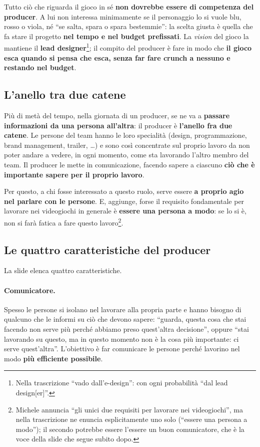 Tutto ciò che riguarda il gioco in sé \textbf{non dovrebbe essere di
competenza del producer}. A lui non interessa minimamente se il personaggio
lo si vuole blu, rosso o viola, né ``se salta, spara o spara bestemmie'': la
scelta giusta è quella che fa stare il progetto \textbf{nel tempo e nel budget
prefissati}. La \emph{vision} del gioco la mantiene il \textbf{lead
designer}\footnote{Nella trascrizione ``vado dall'e-design'': con ogni
probabilità ``dal lead design[er]''.}; il compito del producer è fare in modo
che \textbf{il gioco esca quando si pensa che esca, senza far fare crunch a
nessuno e restando nel budget}.

\subsection{L'anello tra due catene}

Più di metà del tempo, nella giornata di un producer, se ne va a
\textbf{passare informazioni da una persona all'altra}: il producer è
\textbf{l'anello fra due catene}. Le persone del team hanno le loro
specialità (design, programmazione, brand management, trailer, \dots) e sono
così concentrate sul proprio lavoro da non poter andare a vedere, in ogni
momento, come sta lavorando l'altro membro del team. Il producer le mette in
comunicazione, facendo sapere a ciascuno \textbf{ciò che è importante sapere
per il proprio lavoro}.

Per questo, a chi fosse interessato a questo ruolo, serve essere \textbf{a
proprio agio nel parlare con le persone}. E, aggiunge, forse il requisito
fondamentale per lavorare nei videogiochi in generale è \textbf{essere una
persona a modo}: se lo si è, non si farà fatica a fare questo
lavoro\footnote{Michele annuncia ``gli unici due requisiti per lavorare nei
videogiochi'', ma nella trascrizione ne enuncia esplicitamente uno solo
(``essere una persona a modo''); il secondo potrebbe essere l'essere un buon
comunicatore, che è la voce della slide che segue subito dopo.}.

\subsection{Le quattro caratteristiche del producer}

La slide elenca quattro caratteristiche.

\paragraph{Comunicatore.} Spesso le persone si isolano nel lavorare alla
propria parte e hanno bisogno di qualcuno che le informi su ciò che devono
sapere: ``guarda, questa cosa che stai facendo non serve più perché abbiamo
preso quest'altra decisione'', oppure ``stai lavorando su questo, ma in questo
momento non è la cosa più importante: ci serve quest'altra''. L'obiettivo è
far comunicare le persone perché lavorino nel modo \textbf{più efficiente
possibile}.

